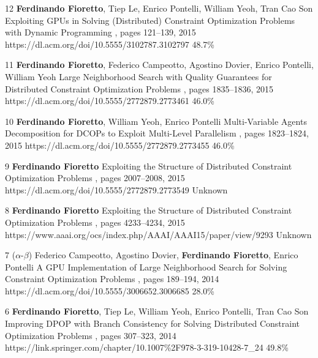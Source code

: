 \begin{pubs}
\confentry
		{12} %
		{{\bf Ferdinando Fioretto}, Tiep Le, Enrico Pontelli, William Yeoh, Tran Cao Son}
		{Exploiting GPUs in Solving (Distributed) Constraint Optimization Problems with Dynamic Programming}
		{\procCP, pages 121--139, 2015}
		{https://dl.acm.org/doi/10.5555/3102787.3102797}
		{48.7\%}%

\confentry
		{11} %
		{{\bf Ferdinando Fioretto}, Federico Campeotto, Agostino Dovier, Enrico Pontelli, William Yeoh}
		{Large Neighborhood Search with Quality Guarantees for Distributed Constraint Optimization Problems}
		{\procAAMAS, pages 1835--1836, 2015}
		{https://dl.acm.org/doi/10.5555/2772879.2773461}
		{46.0\%}

\confentry
		{10} %
		{{\bf Ferdinando Fioretto}, William Yeoh, Enrico Pontelli}
		{Multi-Variable Agents Decomposition for DCOPs to Exploit Multi-Level Parallelism}
		{\procAAMAS, pages 1823--1824, 2015}
		{https://dl.acm.org/doi/10.5555/2772879.2773455}
		{46.0\%}

\confentry
		{9} %
		{{\bf Ferdinando Fioretto}}
		{Exploiting the Structure of Distributed Constraint Optimization Problems} 
		{\procAAMAS, pages 2007--2008, 2015}
		{https://dl.acm.org/doi/10.5555/2772879.2773549}
		{Unknown}

\confentry
		{8} %
		{{\bf Ferdinando Fioretto}} 
		{Exploiting the Structure of Distributed Constraint Optimization Problems}
		{\procAAAI,  pages 4233--4234, 2015}
		{https://www.aaai.org/ocs/index.php/AAAI/AAAI15/paper/view/9293}
		{Unknown}

	\confentry 
		{7} %
		{($\alpha$-$\beta$) 
		Federico Campeotto, Agostino Dovier, {\bf Ferdinando Fioretto}, Enrico Pontelli}
		{A GPU Implementation of Large Neighborhood Search for Solving Constraint Optimization Problems} 
		{\procECAI, pages 189--194, 2014}
		{https://dl.acm.org/doi/10.5555/3006652.3006685}
		{28.0\%}

	\confentry
		{6} %
		{{\bf Ferdinando Fioretto}, Tiep Le, William Yeoh, Enrico Pontelli, Tran Cao Son}
		{Improving DPOP with Branch Consistency for Solving Distributed Constraint Optimization Problems}
		{\procCP, pages 307--323, 2014}
		{https://link.springer.com/chapter/10.1007\%2F978-3-319-10428-7\_24}
		{49.8\%}


\end{pubs}
